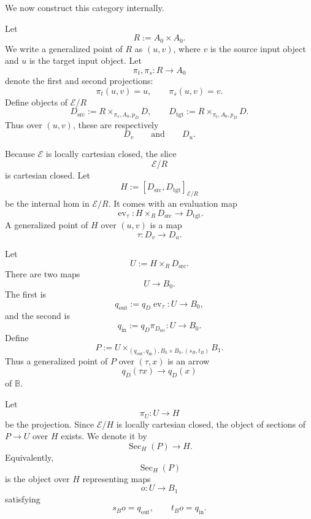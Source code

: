 We now construct this category internally.

Let
\[
R:=A_0\times A_0.
\]
We write a generalized point of \(R\) as \((u,v)\), where \(v\) is the source
input object and \(u\) is the target input object. Let
\[
\pi_t,\pi_s:R\to A_0
\]
denote the first and second projections:
\[
\pi_t(u,v)=u,
\qquad
\pi_s(u,v)=v.
\]
Define objects of \(\mathcal E/R\)
\[
D_{\mathrm{src}}
:=
R\times_{\pi_s,A_0,p_D}D,
\qquad
D_{\mathrm{tgt}}
:=
R\times_{\pi_t,A_0,p_D}D.
\]
Thus over \((u,v)\), these are respectively
\[
D_v
\qquad\text{and}\qquad
D_u.
\]

Because \(\mathcal E\) is locally cartesian closed, the slice
\[
\mathcal E/R
\]
is cartesian closed. Let
\[
H:=[D_{\mathrm{src}},D_{\mathrm{tgt}}]_{\mathcal E/R}
\]
be the internal hom in \(\mathcal E/R\). It comes with an evaluation map
\[
\operatorname{ev}_{\tau}:
H\times_R D_{\mathrm{src}}
\to
D_{\mathrm{tgt}}.
\]
A generalized point of \(H\) over \((u,v)\) is a map
\[
\tau:D_v\to D_u.
\]

Let
\[
U:=H\times_R D_{\mathrm{src}}.
\]
There are two maps
\[
U\to B_0.
\]
The first is
\[
q_{\mathrm{out}}
:=
q_D\operatorname{ev}_{\tau}:U\to B_0,
\]
and the second is
\[
q_{\mathrm{in}}
:=
q_D\pi_{D_{\mathrm{src}}}:U\to B_0.
\]
Define
\[
P:=
U\times_{(q_{\mathrm{out}},q_{\mathrm{in}}),B_0\times B_0,(s_B,t_B)}B_1.
\]
Thus a generalized point of \(P\) over \((\tau,x)\) is an arrow
\[
q_D(\tau x)\to q_D(x)
\]
of \(\mathbb B\).

Let
\[
\pi_U:U\to H
\]
be the projection. Since \(\mathcal E/H\) is locally cartesian closed, the
object of sections of \(P\to U\) over \(H\) exists. We denote it by
\[
\operatorname{Sec}_H(P)\to H.
\]
Equivalently,
\[
\operatorname{Sec}_H(P)
\]
is the object over \(H\) representing maps
\[
o:U\to B_1
\]
satisfying
\[
s_Bo=q_{\mathrm{out}},
\qquad
t_Bo=q_{\mathrm{in}}.
\]

